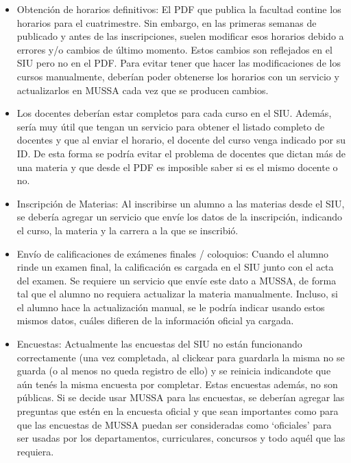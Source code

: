 \documentclass[a4paper]{article}
\begin{document}
\begin{itemize}
	\item Obtención de horarios definitivos: El PDF que publica la facultad contine los horarios para el cuatrimestre. Sin embargo, en las primeras semanas de publicado y antes de las inscripciones, suelen modificar esos horarios debido a errores y/o cambios de último momento. Estos cambios son reflejados en el SIU pero no en el PDF. Para evitar tener que hacer las modificaciones de los cursos manualmente, deberían poder obtenerse los horarios con un servicio y actualizarlos en MUSSA cada vez que se producen cambios.

	\item Los docentes deberían estar completos para cada curso en el SIU. Además, sería muy útil que tengan un servicio para obtener el listado completo de docentes y que al enviar el horario, el docente del curso venga indicado por su ID. De esta forma se podría evitar el problema de docentes que dictan más de una materia y que desde el PDF es imposible saber si es el mismo docente o no.

	\item Inscripción de Materias: Al inscribirse un alumno a las materias desde el SIU, se debería agregar un servicio que envíe los datos de la inscripción, indicando el curso, la materia y la carrera a la que se inscribió.
	
	\item Envío de calificaciones de exámenes finales / coloquios: Cuando el alumno rinde un examen final, la calificación es cargada en el SIU junto con el acta del examen. Se requiere un servicio que envíe este dato a MUSSA, de forma tal que el alumno no requiera actualizar la materia manualmente. Incluso, si el alumno hace la actualización manual, se le podría indicar usando estos mismos datos, cuáles difieren de la información oficial ya cargada.
	
	\item Encuestas: Actualmente las encuestas del SIU no están funcionando correctamente (una vez completada, al clickear para guardarla la misma no se guarda (o al menos no queda registro de ello) y se reinicia indicandote que aún tenés la misma encuesta por completar. Estas encuestas además, no son públicas. Si se decide usar MUSSA para las encuestas, se deberían agregar las preguntas que estén en la encuesta oficial y que sean importantes como para que las encuestas de MUSSA puedan ser consideradas como `oficiales' para ser usadas por los departamentos, curriculares, concursos y todo aquél que las requiera.

\end{itemize}
\end{document}
